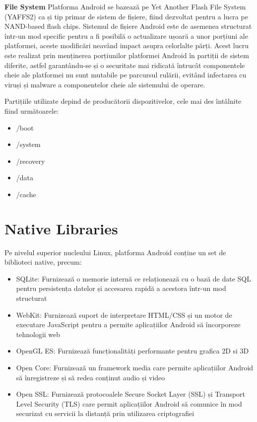 \textbf{File System}\newline
Platforma Android se bazează pe Yet Another Flash File System (YAFFS2) ca și tip primar de sistem de fișiere, fiind dezvoltat pentru a lucra pe NAND-based flash chips. Sistemul de fișiere Android este de asemenea structurat într-un mod specific pentru a fi posibilă o actualizare ușoară a unor porțiuni ale platformei, aceste modificări neavând impact asupra celorlalte părți. Acest lucru este realizat prin menținerea porțiunilor platformei Android în partiții de sistem diferite, astfel garantându-se și o securitate mai ridicată întrucât componentele cheie ale platformei nu sunt mutabile pe parcursul rulării, evitând infectarea cu viruși și malware a componentelor cheie ale sistemului de operare.\cite{2}\newpage

Partițiile utilizate depind de producătorii dispozitivelor, cele mai des întâlnite fiind următoarele:\newline
\begin{itemize}
  \item /boot
  \item /system
  \item /recovery
	\item /data
	\item /cache
\end{itemize}

\section{Native Libraries}
\vspace{1cm}
Pe nivelul superior nucleului Linux, platforma Android conține un set de biblioteci native, precum:
\begin{itemize}
\item SQLite: Furnizează o memorie internă ce relaționează cu o bază de date SQL pentru persistența datelor și accesarea rapidă a acestora într-un mod structurat
\item WebKit:  Furnizează suport de interpretare HTML/CSS  și un motor de executare JavaScript pentru a permite aplicațiilor Android să încorporeze tehnologii web
\item OpenGL ES: Furnizează funcționalități performante pentru grafica 2D si 3D
\item Open Core: Furnizează un framework media care permite aplicațiilor Android să înregistreze și să redea conținut audio și video
\item Open SSL: Furnizează protocoalele Secure Socket Layer (SSL)  și Transport Level Security (TLS) care permit aplicațiilor Android să comunice în mod securizat cu servicii la distanță prin utilizarea criptografiei
\end{itemize}\cite{1}


